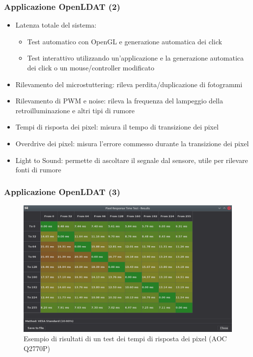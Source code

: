 \documentclass[xcolor={x11names}]{beamer}
\begin{document}
\begin{frame}[shrink=3]
	\frametitle{Applicazione OpenLDAT (2)}
	\begin{itemize}
		\item \alert{Latenza totale del sistema}:\begin{itemize}
			\item \alert{Test automatico} con OpenGL e generazione automatica dei click
			\item \alert{Test interattivo} utilizzando un'applicazione e la generazione automatica dei click o un mouse/controller modificato
		\end{itemize}
		\item \alert{Rilevamento del microstuttering}: rileva perdita/duplicazione di fotogrammi
		\item \alert{Rilevamento di PWM e noise}: rileva la frequenza del lampeggio della retroilluminazione e altri tipi di rumore
		\item \alert{Tempi di risposta dei pixel}: misura il tempo di transizione dei pixel
		\item \alert{Overdrive dei pixel}: misura l'errore commesso durante la transizione dei pixel
		\item \alert{Light to Sound}: permette di ascoltare il segnale dal sensore, utile per rilevare fonti di rumore
	\end{itemize}
\end{frame}
\begin{frame}[shrink=10]
	\frametitle{Applicazione OpenLDAT (3)}
	\begin{figure}
		\includegraphics[width=\textwidth]{Applicazione_files/gui_pixelresponse_results.png}
		\caption*{Esempio di risultati di un test dei tempi di risposta dei pixel (AOC Q2770P)}
	\end{figure}
\end{frame}
\end{document}
